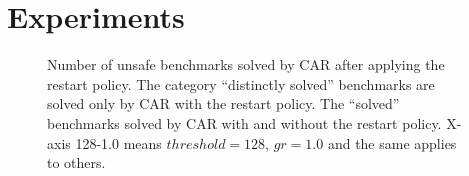 \section{Experiments}
\begin{figure}[t]
\caption{Number of unsafe benchmarks solved by CAR after applying the restart policy. The category ``distinctly solved'' benchmarks are solved only by CAR with the restart policy. The ``solved'' benchmarks solved by CAR with and without the restart policy. X-axis 128-1.0 means $threshold=128$, $gr=1.0$ and the same applies to others.}
\end{figure}
